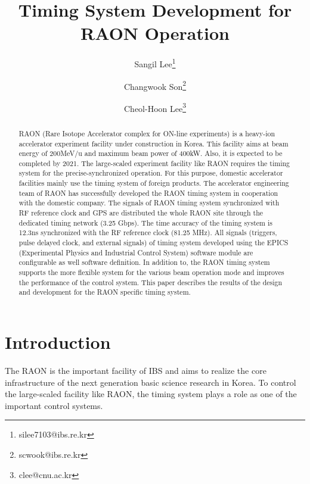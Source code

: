 \documentclass[11pt,a4paper]{article}
\begin{document}
\title{
\textbf{Timing System Development for RAON Operation} %
\vspace{0.5cm}
\Large
}
\author[1]{Sangil Lee\thanks{silee7103@ibs.re.kr}}
\author[2]{Changwook Son\thanks{scwook@ibs.re.kr}}
\author[3]{Cheol-Hoon Lee\thanks{clee@cnu.ac.kr}}
\date{}
\maketitle
\vspace{2em}

\begin{abstract}
RAON (Rare Isotope Accelerator complex for ON-line experiments) is a heavy-ion accelerator experiment facility under construction in Korea. This facility aims at beam energy of 200MeV/u and maximum beam power of 400kW. Also, it is expected to be completed by 2021. The large-scaled experiment facility like RAON requires the timing system for the precise-synchronized operation. For this purpose, domestic accelerator facilities mainly use the timing system of foreign products. The accelerator engineering team of RAON has successfully developed the RAON timing system in cooperation with the domestic company. The signals of RAON timing system synchronized with RF reference clock and GPS are distributed the whole RAON site through the dedicated timing network (3.25 Gbps). The time accuracy of the timing system is 12.3ns synchronized with the RF reference clock (81.25 MHz). All signals (triggers, pulse delayed clock, and external signals) of timing system developed using the EPICS (Experimental Physics and Industrial Control System) software module are configurable as well software definition. In addition to, the RAON timing system supports the more flexible system for the various beam operation mode and improves the performance of the control system. \newline
This paper describes the results of the design and development for the RAON specific timing system.
\end{abstract}

\newpage

\section{Introduction}
The RAON is the important facility of IBS and aims to realize the core infrastructure of the next generation basic science research in Korea. To control the large-scaled facility like RAON, the timing system plays a role as one of the important control systems.
\end{document}
